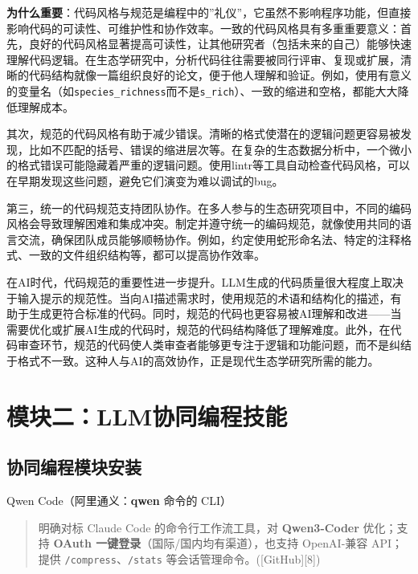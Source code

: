 \documentclass[
]{book}
\begin{document}
\textbf{为什么重要}：代码风格与规范是编程中的''礼仪''，它虽然不影响程序功能，但直接影响代码的可读性、可维护性和协作效率。一致的代码风格具有多重重要意义：首先，良好的代码风格显著提高可读性，让其他研究者（包括未来的自己）能够快速理解代码逻辑。在生态学研究中，分析代码往往需要被同行评审、复现或扩展，清晰的代码结构就像一篇组织良好的论文，便于他人理解和验证。例如，使用有意义的变量名（如\texttt{species\_richness}而不是\texttt{s\_rich}）、一致的缩进和空格，都能大大降低理解成本。

其次，规范的代码风格有助于减少错误。清晰的格式使潜在的逻辑问题更容易被发现，比如不匹配的括号、错误的缩进层次等。在复杂的生态数据分析中，一个微小的格式错误可能隐藏着严重的逻辑问题。使用lintr等工具自动检查代码风格，可以在早期发现这些问题，避免它们演变为难以调试的bug。

第三，统一的代码规范支持团队协作。在多人参与的生态研究项目中，不同的编码风格会导致理解困难和集成冲突。制定并遵守统一的编码规范，就像使用共同的语言交流，确保团队成员能够顺畅协作。例如，约定使用蛇形命名法、特定的注释格式、一致的文件组织结构等，都可以提高协作效率。

在AI时代，代码规范的重要性进一步提升。LLM生成的代码质量很大程度上取决于输入提示的规范性。当向AI描述需求时，使用规范的术语和结构化的描述，有助于生成更符合标准的代码。同时，规范的代码也更容易被AI理解和改进------当需要优化或扩展AI生成的代码时，规范的代码结构降低了理解难度。此外，在代码审查环节，规范的代码使人类审查者能够更专注于逻辑和功能问题，而不是纠结于格式不一致。这种人与AI的高效协作，正是现代生态学研究所需的能力。

\hypertarget{ux6a21ux5757ux4e8cllmux534fux540cux7f16ux7a0bux6280ux80fd}{%
\section{模块二：LLM协同编程技能}\label{ux6a21ux5757ux4e8cllmux534fux540cux7f16ux7a0bux6280ux80fd}}

\hypertarget{ux534fux540cux7f16ux7a0bux6a21ux5757ux5b89ux88c5}{%
\subsection{协同编程模块安装}\label{ux534fux540cux7f16ux7a0bux6a21ux5757ux5b89ux88c5}}

Qwen Code（阿里通义：\textbf{qwen} 命令的 CLI）

\begin{quote}
明确对标 Claude Code 的命令行工作流工具，对 \textbf{Qwen3-Coder} 优化；支持 \textbf{OAuth 一键登录}（国际/国内均有渠道），也支持 OpenAI-兼容 API；提供 \texttt{/compress}、\texttt{/stats} 等会话管理命令。({[}GitHub{]}{[}8{]})
\end{quote}
\end{document}
